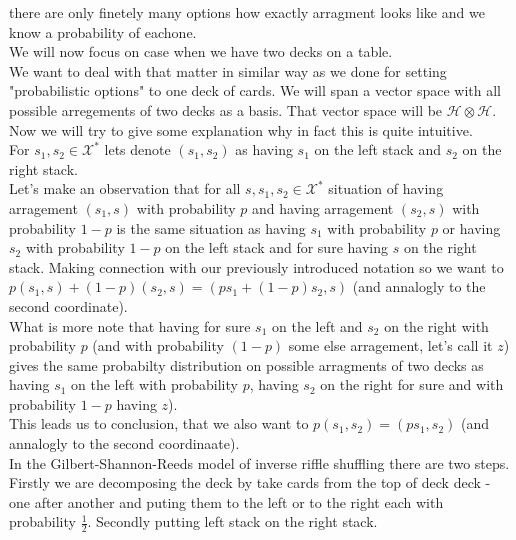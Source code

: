 \documentclass[a4paper, 12pt]{report}
\begin{document}
there are only finetely many options how exactly arragment looks like and we know a probability of eachone. 
\\ We will now focus on case when we have two decks on a table. \\
We want to deal with that matter in similar way as we done for setting "probabilistic options" to one deck 
of cards. We will span a vector space with all possible arregements of two decks as a basis. 
That vector space will be $\mathcal{H} \otimes \mathcal{H}$. Now we will try to give some explanation why in 
fact this is quite intuitive.  \\
For $s_1, s_2 \in \mathcal{X}^*$ lets denote $(s_1, s_2)$ as having $s_1$ on the left stack and $s_2$ 
on the right stack. \\ 
Let's make an observation that for all $s, s_1, s_2 \in \mathcal{X}^*$ situation of having arragement 
$(s_1, s)$ with probability $p$ and having arragement $(s_2, s)$ with probability $1-p$ is 
the same situation as having $s_1$ with probability $p$ or having $s_2$ with probability $1 - p$ on the left 
stack and for sure having $s$ on the right stack. Making connection with our previously introduced notation 
so we want to $p(s_1, s) + (1-p)(s_2, s) = (ps_1 + (1-p)s_2, s)$ (and annalogly to the second coordinate).\\
What is more note that having for sure $s_1$ on the left and $s_2$ on the right with probability $p$ (and 
with probability $(1 - p)$ some else arragement, let's call it $z$) gives the same probabilty distribution 
on possible arragments of two decks as having $s_1$ on the left with probability $p$, having $s_2$ on the 
right for sure and with probability $1-p$ having $z$).\\
This leads us to conclusion, that we also want to $p(s_1,s_2) = (ps_1, s_2)$ (and annalogly to the second 
coordinaate). \\
In the Gilbert-Shannon-Reeds model of inverse riffle shuffling there are two steps. Firstly we are 
decomposing the deck by take cards from the top of deck deck - one after another and puting them to the left 
or to the right each with probability $\frac{1}{2}$. Secondly putting left stack on the right stack. \\
\end{document}
